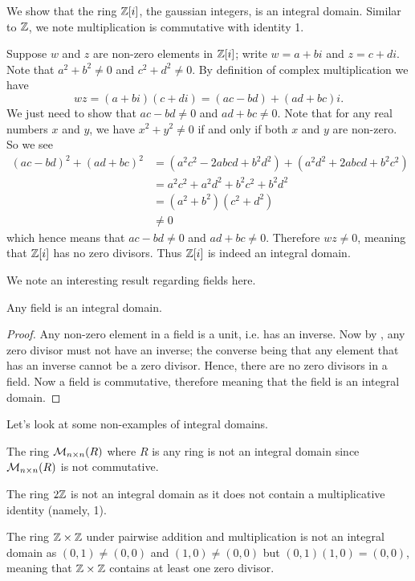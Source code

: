 \begin{example}
    We show that the ring $\mathbb{Z}[i]$, the gaussian integers, is an integral domain. Similar to $\mathbb{Z}$, we note multiplication is commutative with identity 1.

    Suppose $w$ and $z$ are non-zero elements in $\mathbb{Z}[i]$; write $w = a+bi$ and $z = c+di$. Note that $a^2+b^2 \neq 0$ and $c^2 + d^2 \neq 0$. By definition of complex multiplication we have
    \[
        wz = (a+bi)(c+di) = (ac-bd) + (ad+bc)i.
    \]
    We just need to show that $ac-bd \neq 0$ and $ad+bc \neq 0$. Note that for any real numbers $x$ and $y$, we have $x^2 + y^2 \neq 0$ if and only if both $x$ and $y$ are non-zero. So we see
    \begin{align*}
        (ac-bd)^2 + (ad+bc)^2 &= (a^2c^2 - 2abcd + b^2d^2) + (a^2d^2 + 2abcd + b^2c^2)\\
        &= a^2c^2 + a^2d^2 + b^2c^2 + b^2d^2\\
        &= (a^2 + b^2)(c^2 + d^2)\\
        &\neq 0
    \end{align*}
    which hence means that $ac-bd \neq 0$ and $ad+bc \neq 0$. Therefore $wz \neq 0$, meaning that $\mathbb{Z}[i]$ has no zero divisors. Thus $\mathbb{Z}[i]$ is indeed an integral domain.
\end{example}

We note an interesting result regarding fields here.
\begin{proposition}\label{prop-field-is-integral-domain}
    Any field is an integral domain.
\end{proposition}
\begin{proof}
    Any non-zero element in a field is a unit, i.e. has an inverse. Now by , any zero divisor must not have an inverse; the converse being that any element that has an inverse cannot be a zero divisor. Hence, there are no zero divisors in a field. Now a field is commutative, therefore meaning that the field is an integral domain.
\end{proof}

Let's look at some non-examples of integral domains.
\begin{example}
    The ring $\mathcal{M}_{n\times n}(R)$ where $R$ is any ring is not an integral domain since $\mathcal{M}_{n\times n}(R)$ is not commutative.
\end{example}
\begin{example}
    The ring $2\mathbb{Z}$ is not an integral domain as it does not contain a multiplicative identity (namely, 1).
\end{example}
\begin{example}
    The ring $\mathbb{Z} \times \mathbb{Z}$ under pairwise addition and multiplication is not an integral domain as $(0,1) \neq (0, 0)$ and $(1, 0) \neq (0, 0)$ but $(0,1)(1,0) = (0, 0)$, meaning that $\mathbb{Z} \times \mathbb{Z}$ contains at least one zero divisor.
\end{example}


